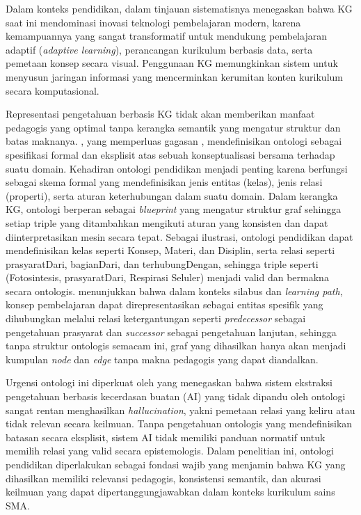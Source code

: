 \documentclass[main]{subfiles}
\begin{document}
Dalam konteks pendidikan, \textcite{abu-salih_systematic_2024} dalam tinjauan
sistematisnya menegaskan bahwa KG saat ini mendominasi inovasi teknologi
pembelajaran modern, karena kemampuannya yang sangat transformatif untuk
mendukung pembelajaran adaptif (\textit{adaptive learning}), perancangan
kurikulum berbasis data, serta pemetaan konsep secara visual. Penggunaan
KG memungkinkan sistem untuk menyusun jaringan informasi yang
mencerminkan kerumitan konten kurikulum secara komputasional.

Representasi pengetahuan berbasis KG tidak akan memberikan manfaat
pedagogis yang optimal tanpa kerangka semantik yang mengatur struktur
dan batas maknanya. \textcite{studer_knowledge_1998}, yang memperluas
gagasan \textcite{gruber_translation_1993}, mendefinisikan ontologi sebagai
spesifikasi formal dan eksplisit atas sebuah konseptualisasi bersama terhadap
suatu domain. Kehadiran ontologi pendidikan menjadi penting
karena berfungsi sebagai skema formal yang mendefinisikan jenis entitas
(kelas), jenis relasi (properti), serta aturan keterhubungan dalam suatu
domain. Dalam kerangka KG, ontologi berperan sebagai
\textit{blueprint} yang mengatur struktur graf sehingga setiap triple
yang ditambahkan mengikuti aturan yang konsisten dan dapat
diinterpretasikan mesin secara tepat. Sebagai ilustrasi, ontologi
pendidikan dapat mendefinisikan kelas seperti Konsep, Materi, dan
Disiplin, serta relasi seperti prasyaratDari, bagianDari, dan
terhubungDengan, sehingga triple seperti (Fotosintesis, prasyaratDari,
Respirasi Seluler) menjadi valid dan bermakna secara ontologis.
\textcite{zhang_learning_2023} menunjukkan bahwa dalam konteks silabus dan
\textit{learning path}, konsep pembelajaran dapat direpresentasikan
sebagai entitas spesifik yang dihubungkan melalui relasi ketergantungan
seperti \textit{predecessor} sebagai pengetahuan prasyarat dan
\textit{successor} sebagai pengetahuan lanjutan, sehingga tanpa
struktur ontologis semacam ini, graf yang dihasilkan hanya akan menjadi
kumpulan \textit{node} dan \textit{edge} tanpa makna pedagogis yang dapat diandalkan.

Urgensi ontologi ini diperkuat oleh \textcite{guo_ontology-enhanced_2025} yang menegaskan
bahwa sistem ekstraksi pengetahuan berbasis kecerdasan buatan (AI) yang
tidak dipandu oleh ontologi sangat rentan menghasilkan
\textit{hallucination}, yakni pemetaan relasi yang keliru atau tidak
relevan secara keilmuan. Tanpa pengetahuan ontologis yang mendefinisikan
batasan secara eksplisit, sistem AI tidak memiliki panduan normatif
untuk memilih relasi yang valid secara epistemologis. Dalam penelitian
ini, ontologi pendidikan diperlakukan sebagai fondasi wajib yang
menjamin bahwa KG yang dihasilkan memiliki relevansi pedagogis,
konsistensi semantik, dan akurasi keilmuan yang dapat
dipertanggungjawabkan dalam konteks kurikulum sains SMA.
\end{document}
